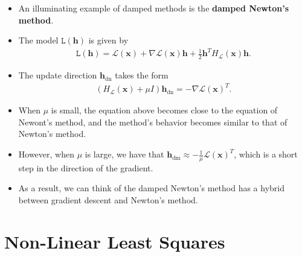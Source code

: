 \documentclass[10pt]{article}
\newcommand{\ve}[1]{\mathbf{#1}}
\newcommand{\mrm}[1]{\mathrm{#1}}
\newcommand{\mcal}[1]{\mathcal{#1}}
\begin{document}
\begin{itemize}
    \item An illuminating example of damped methods is the {\bf damped Newton's method}.
    
    \item The model $\mathtt{L}(\ve{h})$ is given by
    \begin{align*}
        \mathtt{L}(\ve{h}) = \mcal{L}(\ve{x}) + \nabla \mcal{L}(\ve{x})\ve{h} + \frac{1}{2} \ve{h}^T H_{\mcal{L}}(\ve{x}) \ve{h}.
    \end{align*}

    \item The update direction $\ve{h}_{\mrm{dn}}$ takes the form
    \begin{align*}
        (H_{\mcal{L}}(\ve{x}) + \mu I) \ve{h}_{\mrm{dn}} = - \nabla \mcal{L}(\ve{x})^T.
    \end{align*}

    \item When $\mu$ is small, the equation above becomes close to the equation of Newont's method, and the method's behavior becomes similar to that of Newton's method.
    
    \item However, when $\mu$ is large, we have that $\ve{h}_{\mrm{dm}} \approx -\frac{1}{\mu} \mcal{L}(\ve{x})^T$, which is a short step in the direction of the gradient.
    
    \item As a result, we can think of the damped Newton's method has a hybrid between gradient descent and Newton's method.
\end{itemize}

\section{Non-Linear Least Squares}
\end{document}
